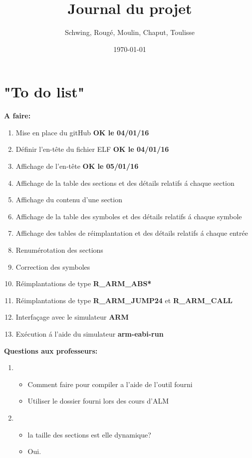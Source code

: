 \documentclass[12pt, a4paper]{article}
\title{Journal du projet}
\author{Schwing, Roug\'e, Moulin, Chaput, Toulisse}
\date{\today}
\begin{document}
\maketitle

\section{"To do list"}
\textbf{A faire:}
\begin{enumerate}
\item Mise en place du gitHub \textbf{OK le 04/01/16} 
\item Définir l'en-t\^ete du fichier ELF \textbf{OK le 04/01/16}
\item Affichage de l'en-t\^ete \textbf{OK le 05/01/16} 
\item Affichage de la table des sections et des détails 
	relatifs \'a chaque section
\item Affichage du contenu d'une section
\item Affichage de la table des symboles et des détails relatifs 
	\'a chaque symbole
\item Affichage des tables de réimplantation et des détails relatifs 
	\'a chaque entrée 
\item Renumérotation des sections
\item Correction des symboles
\item Réimplantations de type \textbf{R\_ARM\_ABS*}
\item Réimplantations de type \textbf{R\_ARM\_JUMP24} et 
	\textbf{R\_ARM\_CALL}
\item Interfaçage avec le simulateur \textbf{ARM}
\item Exécution \'a l'aide du simulateur \textbf{arm-eabi-run}
\end{enumerate}

\textbf{Questions aux professeurs:}
\begin{enumerate}
\item 
	\begin{itemize}
		\item Comment faire pour compiler a l'aide de l'outil fourni
		\item Utiliser le dossier fourni lors des cours d'ALM
	\end{itemize}
\item 
	\begin{itemize}
		\item la taille des sections est elle dynamique?
		\item Oui.
	\end{itemize}
\end{enumerate}
\end{document}
